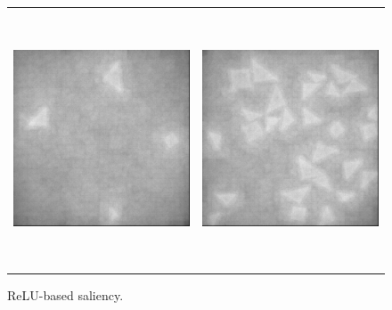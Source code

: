 \begin{figure}
    \begin{center}
        \begin{tabular}{c c}
            \includegraphics[width = 3in, height = 3in]{Counting/LaTeX/figures/putasideall/nolimitscaleresamplingoptiondifferentactivation2networkputaside/image1/saliency.png} & \includegraphics[width = 3in, height = 3in]{Counting/LaTeX/figures/putasideall/nolimitscaleresamplingoptiondifferentactivation2networkputaside/image2/saliency.png}
        \end{tabular}
    \end{center}
    \caption{ReLU-based saliency.}
    \label{initialsaliency}
\end{figure}

